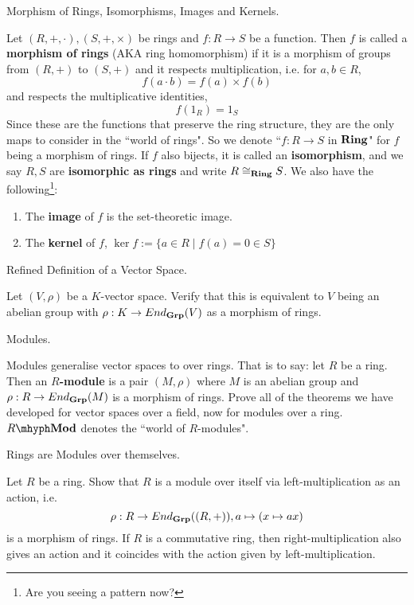 \documentclass[../../book.tex]{subfiles}
\begin{document}
\begin{dfn} Morphism of Rings, Isomorphisms, Images and Kernels. 

    Let $(R,+,\cdot), (S,+,\times)$ be rings and $f : R \to S$ be a function. 
    Then $f$ is called a \textbf{morphism of rings} 
    (AKA ring homomorphism) if 
    it is a morphism of groups from $(R,+)$ to $(S,+)$ and
    it respects multiplication, i.e. for $a, b \in R$, 
    \[f(a \cdot b) = f(a) \times f(b)\]
    and respects the multiplicative identities, 
    \[f(1_R) = 1_S\]
    Since these are the functions that preserve the ring structure, 
    they are the only maps to consider in the ``world of rings".
    So we denote ``$f : R \to S$ in $\mathbf{Ring}$" for $f$ being a morphism of rings. 
    If $f$ also bijects, it is called an \textbf{isomorphism}, and 
    we say $R, S$ are \textbf{isomorphic as rings}
    and write $R \cong_{\mathbf{Ring}} S$. 
    We also have the following\footnote{
    Are you seeing a pattern now?}: 
    \begin{enumerate}
        \item The \textbf{image} of $f$ is the set-theoretic image. 
        \item The \textbf{kernel} of $f$, 
        $\ker f := \{a \in R \mid f(a) = 0 \in S\}$
    \end{enumerate}
\end{dfn}

\begin{ex} [Important] Refined Definition of a Vector Space.

    Let $(V,\rho)$ be a $K$-vector space. 
    Verify that this is equivalent to $V$ being an abelian group
    with $\rho : K \to End_{\mathbf{Grp}}(V)$ as a morphism of rings. 
\end{ex}

\begin{ex} [Important] Modules. 

    Modules generalise vector spaces to over rings.
    That is to say: let $R$ be a ring. 
    Then an \textbf{$R$-module} is a pair $(M,\rho)$ where
    $M$ is an abelian group and $\rho : R \to End_{\mathbf{Grp}}(M)$ is a morphism of rings. 
    Prove all of the theorems we have developed for vector spaces over a field, 
    now for modules over a ring. 
    $\RMod$ denotes the ``world of $R$-modules". 
\end{ex}

\begin{ex} [Important] Rings are Modules over themselves.

    Let $R$ be a ring. 
    Show that $R$ is a module over itself via left-multiplication as an action,
    i.e. \[
        \rho : R \to End_{\mathbf{Grp}}((R,+)), a \mapsto (x \mapsto ax)
    \]
    is a morphism of rings. 
    If $R$ is a commutative ring, 
    then right-multiplication also gives an action and
    it coincides with the action given by left-multiplication. 
\end{ex}
\end{document}
